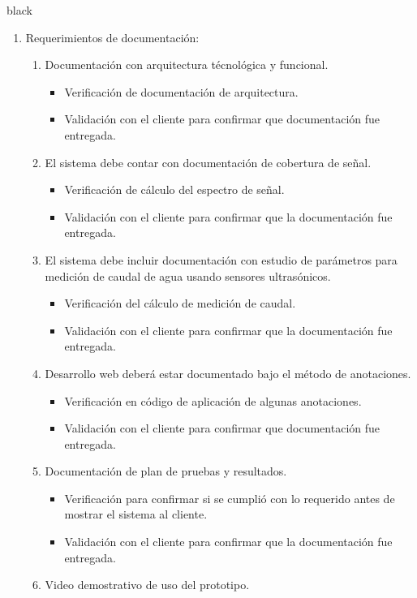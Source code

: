 \documentclass[
11pt, %
codirector, %
]{charter}
\begin{document}
\begin{consigna}{black}
\begin{enumerate}
\item Requerimientos de documentación:
	\begin{enumerate}
		\item Documentación con arquitectura técnológica y funcional.
			\begin{itemize}
				\item Verificación de documentación de arquitectura.
				\item Validación con el cliente para confirmar que documentación fue entregada.
			\end{itemize}
		\item El sistema debe contar con documentación de cobertura de señal. 
			\begin{itemize}
				\item Verificación de cálculo del espectro de señal. 
				\item Validación con el cliente para confirmar que la documentación fue entregada. 
			\end{itemize}
		\item El sistema debe incluir documentación con estudio de parámetros para medición de caudal de agua usando sensores ultrasónicos.
			\begin{itemize}
				\item Verificación del cálculo de medición de caudal. 
				\item Validación con el cliente para confirmar que la documentación fue entregada. 
			\end{itemize}
		\item Desarrollo web deberá estar documentado bajo el método de anotaciones.
			\begin{itemize}
				\item Verificación en código de aplicación de algunas anotaciones. 
				\item Validación con el cliente para confirmar que documentación fue entregada. 
			\end{itemize}
		\item Documentación de plan de pruebas y resultados.
			\begin{itemize}
				\item Verificación para confirmar si se cumplió con lo requerido antes de mostrar el sistema al cliente. 
				\item Validación con el cliente para confirmar que la documentación fue entregada. 
			\end{itemize}
		\item Video demostrativo de uso del prototipo.

\end{enumerate}
\end{enumerate}
\end{consigna}
\end{document}
